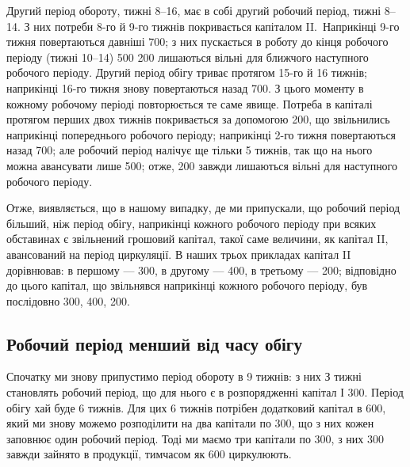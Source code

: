 
Другий період обороту, тижні 8--16, має в собі другий робочий
період, тижні 8--14. З них потреби 8-го й 9-го тижнів покривається
капіталом II.~Наприкінці 9-го тижня повертаються давніші 700;
з них пускається в роботу до кінця робочого періоду (тижні 10--14)
500 200 лишаються вільні для ближчого наступного
робочого періоду. Другий період обігу триває протягом 15-го й 16 тижнів;
наприкінці 16-го тижня знову повертаються назад 700.
З цього моменту в кожному робочому періоді повторюється те саме
явище. Потреба в капіталі протягом перших двох тижнів покривається
за допомогою 200, що звільнились наприкінці попереднього
робочого періоду; наприкінці 2-го тижня повертаються назад 700; але робочий період налічує ще тільки 5 тижнів, так що на нього
можна авансувати лише 500; отже, 200 завжди лишаються
вільні для наступного робочого періоду.

Отже, виявляється, що в нашому випадку, де ми припускали, що робочий
період більший, ніж період обігу, наприкінці кожного робочого
періоду при всяких обставинах є звільнений грошовий капітал, такої
саме величини, як капітал II, авансований на період циркуляції. В наших
трьох прикладах капітал II дорівнював: в першому — 300, в
другому — 400, в третьому — 200; відповідно до
цього капітал, що звільнявся наприкінці кожного робочого періоду, був
послідовно 300, 400, 200.

\subsection{Робочий період менший від часу обігу}

Спочатку ми знову припустимо період обороту в 9 тижнів: з них
З тижні становлять робочий період, що для нього є в розпорядженні
капітал  І \deq{} 300. Період обігу хай буде 6 тижнів. Для цих
6 тижнів потрібен додатковий капітал в 600, який ми знову
можемо розподілити на два капітали по 300, що з них кожен
заповнює один робочий період. Тоді ми маємо три капітали по 300, з них 300 завжди зайнято в продукції, тимчасом як
600 циркулюють.

